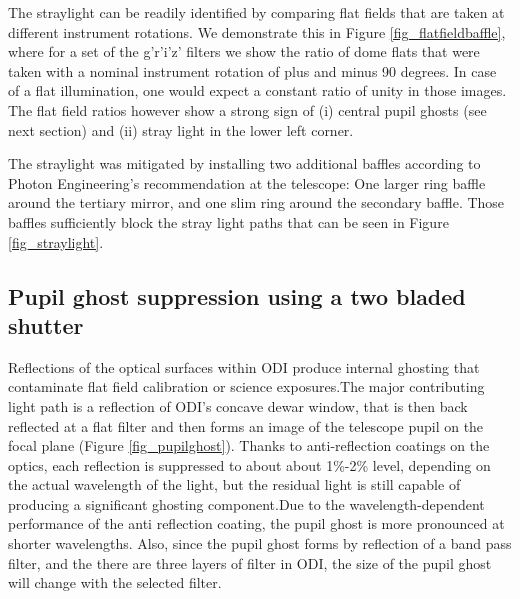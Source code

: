 \documentclass[]{spieman}
\begin{document}
The straylight  can be readily identified by comparing flat fields that are
taken at different instrument rotations. We demonstrate this in Figure
\ref{fig_flatfieldbaffle}, where for a set of the g'r'i'z' filters we show the
ratio of dome flats that were taken with a nominal instrument rotation of plus
and minus 90 degrees.  In case of a flat illumination, one would expect a
constant ratio of unity in those images. The flat field ratios however show a
strong sign of (i) central pupil ghosts (see next section) and (ii) stray light
in the lower left corner.

 




The straylight was mitigated by installing two additional baffles according to
Photon Engineering's recommendation  at the telescope: One larger ring baffle
around the tertiary mirror, and one slim ring around the secondary baffle. Those
baffles sufficiently block the stray light paths that can be seen in Figure
\ref{fig_straylight}.


\subsection{Pupil ghost suppression using a two bladed shutter}
\label{sect_ghost}

Reflections of the optical surfaces within ODI produce internal ghosting that
contaminate flat field calibration or science exposures.The major contributing
light path is a reflection of ODI’s concave dewar window, that is then back
reflected at a flat filter and then forms an image of the telescope pupil on the
focal plane (Figure \ref{fig_pupilghost}).  Thanks to anti-reflection coatings
on the optics, each reflection is suppressed to about about 1\%-2\% level,
depending on the actual wavelength of the light, but the residual light is still
capable of producing a significant ghosting component.Due to the
wavelength-dependent performance of the anti reflection coating, the pupil ghost
is more pronounced at shorter wavelengths. Also, since the pupil ghost forms by
reflection of a band pass filter, and the there are three layers of filter in
ODI, the size of the pupil ghost will change with the selected filter.
\end{document}
